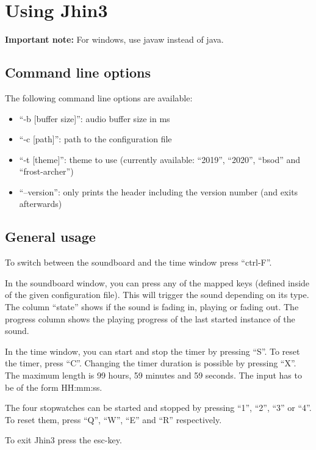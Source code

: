 \section{Using Jhin3}

\textbf{Important note:} For windows, use javaw instead of java.

\subsection{Command line options}

The following command line options are available:
\begin{itemize}
\item ``-b [buffer size]'': audio buffer size in ms
\item ``-c [path]'': path to the configuration file
\item ``-t [theme]'': theme to use (currently available: ``2019'', ``2020'', ``bsod'' and ``frost-archer'')
\item ``--version'': only prints the header including the version number (and exits afterwards)
\end{itemize}

\subsection{General usage}

To switch between the soundboard and the time window press ``ctrl-F''.

In the soundboard window, you can press any of the mapped keys (defined inside of the given configuration file). This will trigger the sound depending on its type.
The column ``state'' shows if the sound is fading in, playing or fading out. The progress column shows the playing progress of the last started instance of the sound.

In the time window, you can start and stop the timer by pressing ``S''. To reset the timer, press ``C''.
Changing the timer duration is possible by pressing ``X''. The maximum length is 99 hours, 59 minutes and 59 seconds. The input has to be of the form HH:mm:ss.

The four stopwatches can be started and stopped by pressing ``1'', ``2'', ``3'' or ``4''. To reset them, press ``Q'', ``W'', ``E'' and ``R'' respectively.

To exit Jhin3 press the esc-key.